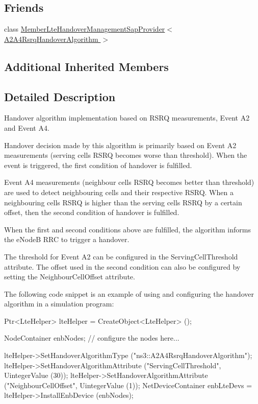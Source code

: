 \subsection*{Friends}
\begin{DoxyCompactItemize}
\item 
class \hyperlink{classns3_1_1A2A4RsrqHandoverAlgorithm_a19b73e89b335cae4f61749f6146e7a8f}{Member\+Lte\+Handover\+Management\+Sap\+Provider$<$ A2\+A4\+Rsrq\+Handover\+Algorithm $>$}
\end{DoxyCompactItemize}
\subsection*{Additional Inherited Members}


\subsection{Detailed Description}
Handover algorithm implementation based on R\+S\+RQ measurements, Event A2 and Event A4. 

Handover decision made by this algorithm is primarily based on Event A2 measurements (serving cell\textquotesingle{}s R\+S\+RQ becomes worse than threshold). When the event is triggered, the first condition of handover is fulfilled.

Event A4 measurements (neighbour cell\textquotesingle{}s R\+S\+RQ becomes better than threshold) are used to detect neighbouring cells and their respective R\+S\+RQ. When a neighbouring cell\textquotesingle{}s R\+S\+RQ is higher than the serving cell\textquotesingle{}s R\+S\+RQ by a certain offset, then the second condition of handover is fulfilled.

When the first and second conditions above are fulfilled, the algorithm informs the e\+NodeB R\+RC to trigger a handover.

The threshold for Event A2 can be configured in the {\ttfamily Serving\+Cell\+Threshold} attribute. The offset used in the second condition can also be configured by setting the {\ttfamily Neighbour\+Cell\+Offset} attribute.

The following code snippet is an example of using and configuring the handover algorithm in a simulation program\+: \begin{DoxyVerb}Ptr<LteHelper> lteHelper = CreateObject<LteHelper> ();

NodeContainer enbNodes;
// configure the nodes here...

lteHelper->SetHandoverAlgorithmType ("ns3::A2A4RsrqHandoverAlgorithm");
lteHelper->SetHandoverAlgorithmAttribute ("ServingCellThreshold",
                                          UintegerValue (30));
lteHelper->SetHandoverAlgorithmAttribute ("NeighbourCellOffset",
                                          UintegerValue (1));
NetDeviceContainer enbLteDevs = lteHelper->InstallEnbDevice (enbNodes);
\end{DoxyVerb}


